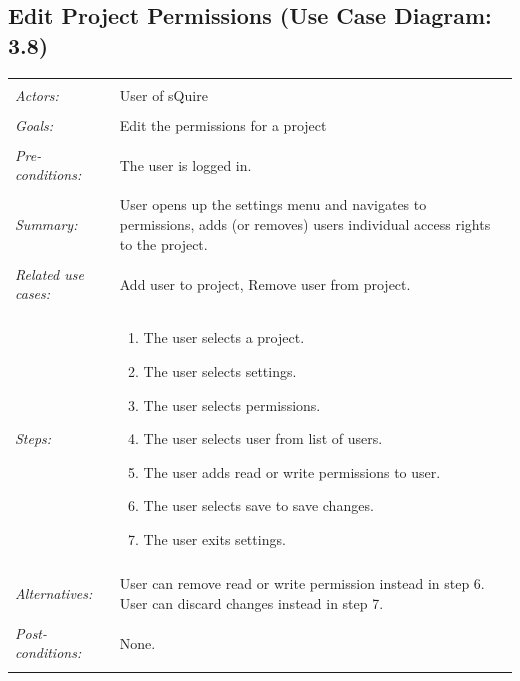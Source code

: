 \documentclass[11pt]{report}
\begin{document}
\subsection{Edit Project Permissions (Use Case Diagram: 3.8)}
\begin{tabular}{ p{2cm} p{12cm} }
 \hline
 \\
 \textit{Actors:} & User of sQuire \\ 
 \\
 \textit{Goals:} & Edit the permissions for a project \\
 \\
 \textit{Pre-conditions:} & The user is logged in. \\
 \\
 \textit{Summary:} & User opens up the settings menu and navigates to permissions, adds (or removes) users individual access rights to the project.  \\ 
 \\
 \textit{Related use cases:} & Add user to project, Remove user from project. \\ 
 \\
 \textit{Steps:} & \begin{enumerate}
  \item The user selects a project.
  \item The user selects settings.
  \item The user selects permissions.
  \item The user selects user from list of users.
  \item The user adds read or write permissions to user.
  \item The user selects save to save changes.
  \item The user exits settings.
 \end{enumerate} \\
 \\
 \textit{Alternatives:} & User can remove read or write permission instead in step 6. User can discard changes instead in step 7. \\
 \\
 \textit{Post-conditions:} & None. \\
 \\
\hline
\end{tabular}
\end{document}
